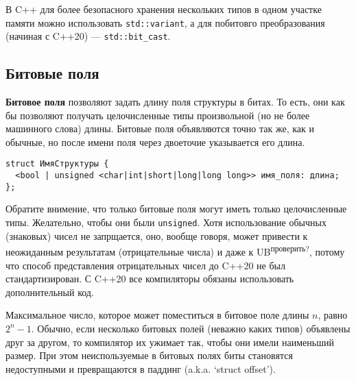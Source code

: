 {\small В C++ для более безопасного хранения нескольких типов в одном участке памяти можно использовать
\verb|std::variant|, а для побитовго преобразования (начиная с C++20) --- \verb|std::bit_cast|.}

\subsection*{Битовые поля}
\textbf{Битовое поля} позволяют задать длину поля структуры в битах. %
То есть, они как бы позволяют получать целочисленные типы произвольной (но не
более машинного слова) длины. Битовые поля объявляются точно так же, как и обычные,
но после имени поля через двоеточие указывается его длина.
\begin{verbatim}
struct ИмяСтруктуры {
  <bool | unsigned <char|int|short|long|long long>> имя_поля: длина;
};
\end{verbatim}

Обратите внимение, что только битовые поля могут иметь только целочисленные типы.
{\small Желательно, чтобы они были \verb|unsigned|. Хотя использование обычных (знаковых)
чисел не запрщается, оно, вообще говоря, может привести к неожиданным результатам (отрицательные числа) и даже к UB\textsuperscript{проверить?},
потому что способ представления отрицательных чисел до C++20 не был стандартизирован.
С C++20 все компиляторы обязаны использовать дополнительный код.}

Максимальное число, которое может поместиться в битовое поле длины $n$, равно $2^n - 1$.
Обычно, если несколько битовых полей (неважно каких типов) объявлены друг за другом, то
компилятор их ужимает так, чтобы они имели наименьший размер. При этом неиспользуемые в
битовых полях биты становятся недоступными и превращаются в паддинг (a.k.a. `struct offset').


